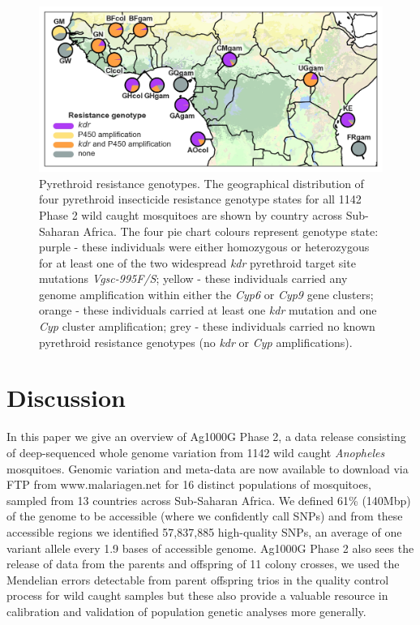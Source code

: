 \documentclass[a4paper,11pt,abstracton,hidelinks]{scrartcl}
\begin{document}
\begin{figure}[H]
	\begin{center}
		\includegraphics*[width=6.3in]{artwork/pyrethroid_resistance_simplified.jpg}
	\end{center}
	\caption{Pyrethroid resistance genotypes. The geographical distribution of four pyrethroid insecticide resistance genotype states for all 1142 Phase 2 wild caught mosquitoes are shown by country across Sub-Saharan Africa. The four pie chart colours represent genotype state: purple - these individuals were either homozygous or heterozygous for at least one of the two widespread \textit{kdr} pyrethroid target site mutations \textit{Vgsc-995F/S}; yellow - these individuals carried any genome amplification within either the \textit{Cyp6} or \textit{Cyp9} gene clusters; orange - these individuals carried at least one \textit{kdr} mutation and one \textit{Cyp} cluster amplification; grey - these individuals carried no known pyrethroid resistance genotypes (no \textit{kdr} or \textit{Cyp} amplifications).}
	\label{ir}
\end{figure}





\section*{Discussion}


In this paper we give an overview of Ag1000G Phase 2, a data release consisting of deep-sequenced whole genome variation from 1142 wild caught \emph{Anopheles} mosquitoes.
%
Genomic variation and meta-data are now available to download via FTP from www.malariagen.net for 16 distinct populations of mosquitoes, sampled from 13 countries across Sub-Saharan Africa. 
%
We defined 61\% (140Mbp) of the genome to be accessible (where we confidently call SNPs) and from these accessible regions we identified 57,837,885 high-quality SNPs, an average of one variant allele every 1.9 bases of accessible genome.
%
Ag1000G Phase 2 also sees the release of data from the parents and offspring of 11 colony crosses, we used the Mendelian errors detectable from parent offspring trios in the quality control process for wild caught samples but these also provide a valuable resource in calibration and validation of population genetic analyses more generally.
\end{document}
